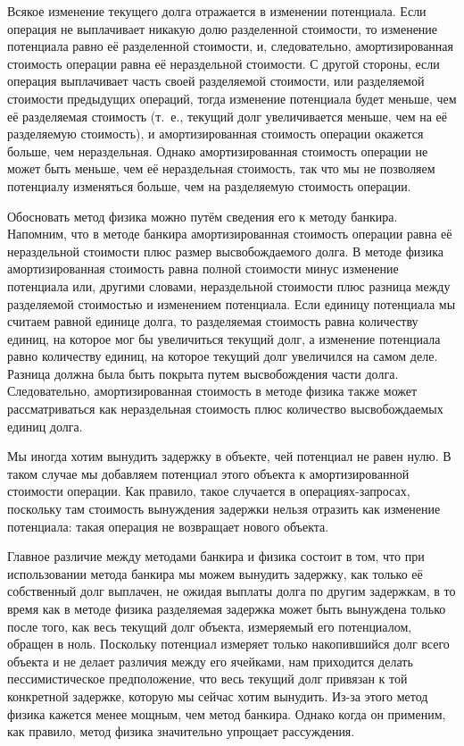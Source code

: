 Всякое изменение текущего долга отражается в изменении потенциала.
Если операция не выплачивает никакую долю разделенной стоимости, то
изменение потенциала равно её разделенной стоимости, и, следовательно,
амортизированная стоимость операции равна её нераздельной стоимости. С
другой стороны, если операция выплачивает часть своей разделяемой
стоимости, или разделяемой стоимости предыдущих операций, тогда
изменение потенциала будет меньше, чем её разделяемая стоимость
(т.~е., текущий долг увеличивается меньше, чем на её разделяемую
стоимость), и амортизированная стоимость операции окажется больше, чем
нераздельная. Однако амортизированная стоимость операции не может быть
меньше, чем её нераздельная стоимость, так что мы не позволяем
потенциалу изменяться больше, чем на разделяемую стоимость операции.

Обосновать метод физика можно путём сведения его к методу
банкира. Напомним, что в методе банкира амортизированная стоимость
операции равна её нераздельной стоимости плюс размер
высвобождаемого долга. В методе физика амортизированная стоимость
равна полной стоимости минус изменение потенциала или, другими
словами, нераздельной стоимости плюс разница между разделяемой
стоимостью и изменением потенциала.  Если единицу потенциала мы
считаем равной единице долга, то разделяемая стоимость равна
количеству единиц, на которое мог бы увеличиться текущий долг, а
изменение потенциала равно количеству единиц, на которое текущий долг
увеличился на самом деле. Разница должна была быть покрыта путем
высвобождения части долга.  Следовательно, амортизированная стоимость
в методе физика также может рассматриваться как нераздельная стоимость
плюс количество высвобождаемых единиц долга.

Мы иногда хотим вынудить задержку в объекте, чей потенциал не равен
нулю. В таком случае мы добавляем потенциал этого объекта к
амортизированной стоимости операции. Как правило, такое случается в
операциях-запросах, поскольку там стоимость вынуждения задержки нельзя
отразить как изменение потенциала: такая операция не возвращает нового
объекта.

Главное различие между методами банкира и физика состоит в том, что
при использовании метода банкира мы можем вынудить задержку, как только
её собственный долг выплачен, не ожидая выплаты долга по другим
задержкам, в то время как в методе физика разделяемая задержка может
быть вынуждена только после того, как весь текущий долг объекта,
измеряемый его потенциалом, обращен в ноль.  Поскольку потенциал
измеряет только накопившийся долг всего объекта и не делает различия
между его ячейками, нам приходится делать пессимистическое
предположение, что весь текущий долг привязан к той конкретной
задержке, которую мы сейчас хотим вынудить. Из-за этого метод физика
кажется менее мощным, чем метод банкира. Однако когда он применим, как
правило, метод физика значительно упрощает рассуждения.

